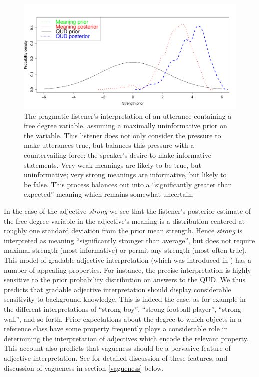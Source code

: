 \documentclass[pdfextras]{handbook}
\begin{document}
\begin{figure}[tbh]
\begin{center}
\includegraphics[scale=.4]{L1-strong-interp.pdf}
\end{center}
\label{L1-adjective-interp}
\caption{The pragmatic listener's interpretation of an utterance containing a free degree variable, assuming a maximally uninformative prior on the variable. 
This listener does not only consider the pressure to make utterances true, but balances this pressure with a countervailing force: the speaker's desire to make informative statements. 
Very weak meanings are likely to be true, but uninformative; very strong meanings are informative, but likely to be false. 
This process balances out into a ``significantly greater than expected'' meaning which remains somewhat uncertain.}
\end{figure}

In the case of the adjective \emph{strong} we see that the listener's posterior estimate of the free degree variable in the adjective's meaning is a distribution centered at roughly one standard deviation from the prior mean strength.
Hence \emph{strong} is interpreted as meaning ``significantly stronger than average'', but does not require maximal strength (most informative) or permit any strength (most often true). 
This model of gradable adjective interpretation (which was introduced in \cite{lassitergoodman13}) has a number of appealing properties. 
For instance, the precise interpretation is highly sensitive to the prior probability distribution on answers to the QUD. 
We thus predicts that gradable adjective interpretation should display considerable sensitivity to background knowledge. 
This is indeed the case, as for example in the different interpretations of ``strong boy'', ``strong football player'', ``strong wall'', and so forth. 
Prior expectations about the degree to which objects in a reference class have some property frequently plays a considerable role in determining the interpretation of adjectives which encode the relevant property. 
This account also predicts that vagueness should be a pervasive feature of adjective interpretation. 
See \cite{lassitergoodman13} for detailed discussion of these features, and discussion of vagueness in section \ref{vagueness} below. 
\end{document}
